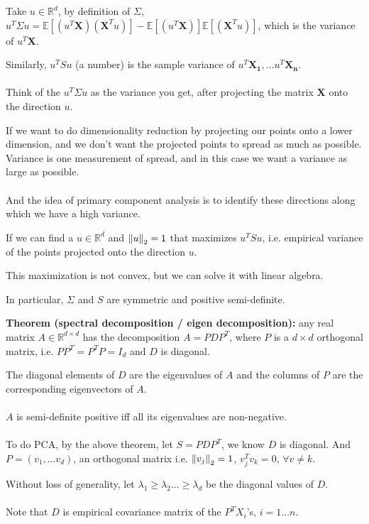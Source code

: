 \documentclass{article}
\begin{document}
Take $u \in \mathbb{R}^d$, by definition of $\Sigma$,
$u^T \Sigma u = \mathbb{E}[(u^T \mathbf{X}) (\mathbf{X}^T u)] - \mathbb{E}[(u^T \mathbf{X})] \mathbb{E}[(\mathbf{X}^T u)]$,
which is the variance of $u^T \mathbf{X}$.

Similarly, $u^T S u$ (a number) is the sample variance of $u^T \mathbf{X_1}, \dots u^T \mathbf{X_n}$.
\\
\\
Think of the $u^T \Sigma u$ as the variance you get, after projecting the matrix $\mathbf{X}$ onto the direction $u$.

If we want to do dimensionality reduction by projecting our points onto a lower dimension,
and we don't want the projected points to spread as much as possible.
Variance is one measurement of spread, and in this case we want a variance as large as possible.
\\
\\
And the idea of primary component analysis is to identify these directions along which we have a high variance.

If we can find a $u \in \mathbb{R}^d$ and $\norm{u}_2 = 1$ that maximizes $u^T S u$,
i.e. empirical variance of the points projected onto the direction $u$.

This maximization is not convex, but we can solve it with linear algebra.

In particular, $\Sigma$ and $S$ are symmetric and positive semi-definite.

\textbf{Theorem (spectral decomposition / eigen decomposition):}
any real matrix $A \in \mathbb{R}^{d \times d}$ has the decomposition $A = P D P^T$,
where $P$ is a $d \times d$ orthogonal matrix, i.e. $P P^T = P^T P = \mathit{I}_d$ and
$D$ is diagonal.

The diagonal elements of $D$ are the eigenvalues of $A$ and the columns of $P$ are the corresponding eigenvectors of $A$.
\\
\\
$A$ is semi-definite positive iff all its eigenvalues are non-negative.
\\
\\

To do PCA, by the above theorem, let $S = P D P^T$, we know $D$ is diagonal.
And $P = (v_1, \dots v_d)$, an orthogonal matrix i.e. $\norm{v_j}_2 = 1$, $v_j^T v_k = 0$, $\forall v \neq k$.

Without loss of generality, let $\lambda_1 \geq \lambda_2 \dots \geq \lambda_d$ be the diagonal values of $D$.
\\
\\
Note that $D$ is empirical covariance matrix of the $P^T X_i$'s, $i = 1 \dots n$.
\end{document}
